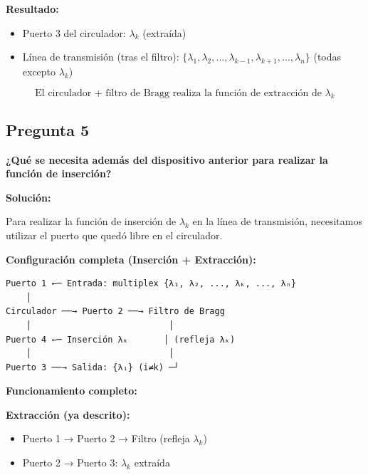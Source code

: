 \documentclass[12pt,a4paper]{article}
\begin{document}
\textbf{Resultado:}
\begin{itemize}
    \item Puerto 3 del circulador: $\lambda_k$ (extraída)
    \item Línea de transmisión (tras el filtro): $\{\lambda_1, \lambda_2, ..., \lambda_{k-1}, \lambda_{k+1}, ..., \lambda_n\}$ (todas excepto $\lambda_k$)
\end{itemize}

\begin{equation}
\boxed{\text{El circulador + filtro de Bragg realiza la función de extracción de } \lambda_k}
\end{equation}

\subsection*{Pregunta 5}
\textbf{¿Qué se necesita además del dispositivo anterior para realizar la función de inserción?}

\vspace{0.3cm}
\textbf{Solución:}

Para realizar la función de inserción de $\lambda_k$ en la línea de transmisión, necesitamos utilizar el puerto que quedó libre en el circulador.

\textbf{Configuración completa (Inserción + Extracción):}

\begin{verbatim}
Puerto 1 ←─ Entrada: multiplex {λ₁, λ₂, ..., λₖ, ..., λₙ}
    │
Circulador ──→ Puerto 2 ──→ Filtro de Bragg
    │                           │
Puerto 4 ←─ Inserción λₖ       │ (refleja λₖ)
    │                           │
Puerto 3 ──→ Salida: {λᵢ} (i≠k) ─┘
\end{verbatim}

\textbf{Funcionamiento completo:}

\textbf{Extracción (ya descrito):}
\begin{itemize}
    \item Puerto 1 → Puerto 2 → Filtro (refleja $\lambda_k$)
    \item Puerto 2 → Puerto 3: $\lambda_k$ extraída
\end{itemize}
\end{document}
